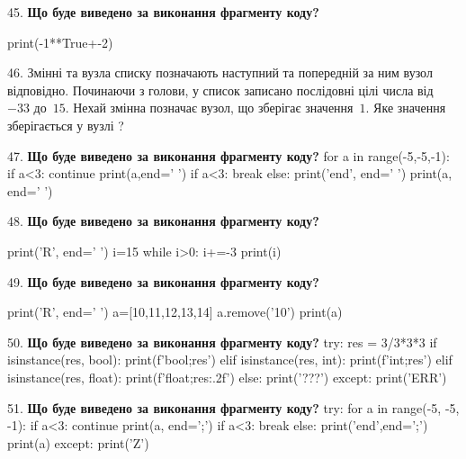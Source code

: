 \documentclass[11pt]{article}
\begin{document}
45. \textbf{Що буде виведено за виконання фрагменту коду?}

print(-1**True+-2)
\par\vspace{5mm}

46. 
Змінні  та  вузла списку позначають наступний та попередній за ним вузол відповідно. Починаючи з голови, у список записано послідовні цілі числа від~$-33$ до~$15$. Нехай змінна  позначає вузол, що зберігає значення~$1$.
Яке значення зберігається у вузлі  ?
\par\vspace{5mm}

47. \textbf{Що буде виведено за виконання фрагменту коду?}
for a in range(-5,-5,-1):
    if a<3:
        continue
        print(a,end=' ')
    if a<3:
        break
else:
    print('end', end=' ')
print(a, end=' ')
\par\vspace{5mm}

48. \textbf{Що буде виведено за виконання фрагменту коду?}

print('R', end=' ')
i=15
while i>0:
    i+=-3
print(i)

\par\vspace{5mm}

49. \textbf{Що буде виведено за виконання фрагменту коду?}

print('R', end=' ')
a=[10,11,12,13,14]
a.remove('10')
print(a)

\par\vspace{5mm}

50. \textbf{Що буде виведено за виконання фрагменту коду?}
try:
    res = 3/3*3*3
    if isinstance(res, bool):
        print(f'bool;{res}')
    elif isinstance(res, int):
        print(f'int;{res}')
    elif isinstance(res, float):
        print(f'float;{res:.2f}')
    else:
        print('???')
except:
    print('ERR')
\par\vspace{5mm}

51. \textbf{Що буде виведено за виконання фрагменту коду?}
try:
    for a in range(-5, -5, -1):
        if a<3:
            continue
        print(a, end=';')
        if a<3:
            break
    else:
        print('end',end=';')
    print(a)
except:
    print('Z')
\par\vspace{5mm}
\end{document}
